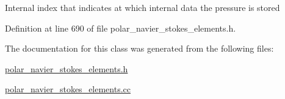 Internal index that indicates at which internal data the pressure is stored 

Definition at line 690 of file polar\+\_\+navier\+\_\+stokes\+\_\+elements.\+h.



The documentation for this class was generated from the following files\+:\begin{DoxyCompactItemize}
\item 
\hyperlink{polar__navier__stokes__elements_8h}{polar\+\_\+navier\+\_\+stokes\+\_\+elements.\+h}\item 
\hyperlink{polar__navier__stokes__elements_8cc}{polar\+\_\+navier\+\_\+stokes\+\_\+elements.\+cc}\end{DoxyCompactItemize}
